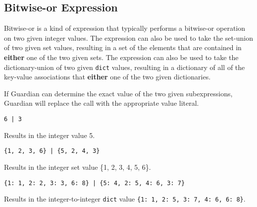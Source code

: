 
\subsection{Bitwise-or Expression}
{
	Bitwise-or is a kind of expression that typically performs
	a bitwise-or operation on two given integer values.
	The expression can also be used to take the set-union
	of two given set values, resulting in a set of the
	elements that are contained in
	\textbf{either} one of the two given sets.
	The expression can also be used to take the
	dictionary-union of two given
	\texttt{dict} values, resulting in a dictionary of
	all of the key-value
	associations that \textbf{either} one of the two given
	dictionaries.
	
	If Guardian can determine the exact value of the two given subexpressions,
	Guardian will replace the call with the appropriate value literal.
	
	\begin{itemize}
	{
		\item[] \texttt{6 | 3}
		
			Results in the integer value 5.
		
		\item[] \texttt{\{1, 2, 3, 6\} | \{5, 2, 4, 3\}}
		
			Results in the integer set value \{1, 2, 3, 4, 5, 6\}.
		
		\item[] \texttt{\{1: 1, 2: 2, 3: 3, 6: 8\} | \{5: 4, 2: 5, 4: 6, 3: 7\}}
		
			Results in the integer-to-integer \texttt{dict}
			value \texttt{\{1: 1, 2: 5, 3: 7, 4: 6, 6: 8\}}.
	}
	\end{itemize}
}
